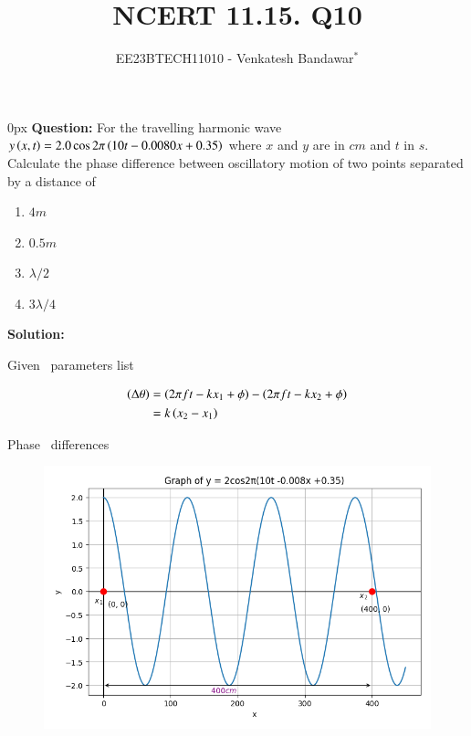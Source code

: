 \documentclass[journal,12pt,twocolumn]{IEEEtran}
\theoremstyle{remark}
\begin{document}

\vspace{3cm}

\title{NCERT 11.15. Q10}
\author{EE23BTECH11010 - Venkatesh Bandawar$^{*}$%
}
\maketitle
\newpage
\bigskip

\renewcommand{\thefigure}{\arabic{figure}}
\renewcommand{\thetable}{\arabic{table}}



\parindent 0px
\textbf{Question:} For the travelling harmonic wave
$y\left(x, t\right) = 2.0 \cos 2\pi \left(10t - 0.0080 x + 0.35\right)$ where $x$ and $y$ are in $cm$ and $t$ in $s$. Calculate the phase difference between oscillatory
motion of two points separated by a distance of 

\begin{enumerate} [label=(\alph*)]
    \item $4 m$
    \item $0.5 m$
    \item $\lambda/2$
    \item $3\lambda/4$
\end{enumerate}

\textbf{Solution:}  
\begin{table}[htbp] \small
\centering

\caption{Given \, parameters list}
\label{tab:given parameters list}
\end{table}
\begin{align}
    \left(\Delta \theta\right) &= \left( 2\pi f t - kx_1 + \phi\right)  - \left(2\pi f t -kx_2 + \phi\right)\\
    &= k\left(x_2 - x_1\right) 
\end{align}

\begin{table}[htbp] 
\centering

\caption{Phase \, differences}
\label{tab:phase differences}
\end{table}

\begin{figure}[!h] 
\centering
\includegraphics[width=\columnwidth]{figs/graph1.png}
\captionsetup{justification=centering}
\caption{}
\label{fig:Graph1}
\end{figure}
\end{document}
